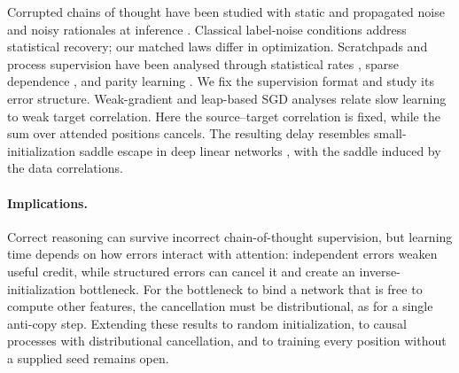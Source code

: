 Corrupted chains of thought have been studied with static and propagated noise \citep{havrilla2024noise}
and noisy rationales at inference \citep{zhou2024noisyrationales}. Classical label-noise conditions
\citep{natarajan2013noisy,patrini2017loss} address statistical recovery; our matched laws differ in optimization.
Scratchpads and process supervision \citep{nye2021scratchpads,wei2022cot,uesato2022solving,lightman2023verify}
have been analysed through statistical rates \citep{jia2025verify,hanneke2026samplecomplexityautoregressivereasoning},
sparse dependence \citep{wen2024sparse}, and parity learning \citep{kim2024parity}.
We fix the supervision format and study its error structure.
Weak-gradient \citep{shalevshwartz2017failures,abbe2025parities} and leap-based SGD analyses
\citep{abbe2021staircase,abbe2023sgd} relate slow learning to weak target correlation.
Here the source--target correlation is fixed, while the sum over attended positions cancels.
The resulting delay resembles small-initialization saddle escape in deep linear networks
\citep{saxe2014exact,shamir2019exponential}, with the saddle induced by the data correlations.

\paragraph{Implications.}
\label{sec:conclusion}

Correct reasoning can survive incorrect chain-of-thought supervision, but learning time depends on how errors interact with attention:
independent errors weaken useful credit, while structured errors can cancel it and create an inverse-initialization bottleneck.
For the bottleneck to bind a network that is free to compute other features, the cancellation must be distributional, as for a single anti-copy step.
Extending these results to random initialization, to causal processes with distributional cancellation, and to training every position without a supplied seed remains open.
